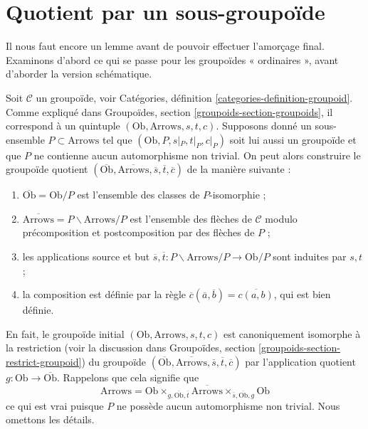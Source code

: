 \section{Quotient par un sous-groupoïde}
\label{section-dividing}

\noindent
Il nous faut encore un lemme avant de pouvoir effectuer l'amorçage final.
Examinons d'abord ce qui se passe pour les groupoïdes « ordinaires », avant
d'aborder la version schématique.

\medskip\noindent
Soit $\mathcal{C}$ un groupoïde, voir
Catégories, définition \ref{categories-definition-groupoid}.
Comme expliqué dans
Groupoïdes, section \ref{groupoids-section-groupoids},
il correspond à un quintuple $(\text{Ob}, \text{Arrows}, s, t, c)$.
Supposons donné un sous-ensemble $P \subset \text{Arrows}$ tel que
$(\text{Ob}, P, s|_P, t|_P, c|_P)$ soit lui aussi un groupoïde et que
$P$ ne contienne aucun automorphisme non trivial. On peut alors construire
le groupoïde quotient
$(\overline{\text{Ob}}, \overline{\text{Arrows}}, \overline{s},
\overline{t}, \overline{c})$
de la manière suivante :
\begin{enumerate}
\item $\overline{\text{Ob}} = \text{Ob}/P$
est l'ensemble des classes de $P$-isomorphie ;
\item $\overline{\text{Arrows}} = P\backslash \text{Arrows}/P$
est l'ensemble des flèches de $\mathcal{C}$ modulo précomposition et
postcomposition par des flèches de $P$ ;
\item les applications source et but
$\overline{s}, \overline{t} : P\backslash \text{Arrows}/P \to \text{Ob}/P$
sont induites par $s, t$ ;
\item la composition est définie par la règle
$\overline{c}(\overline{a}, \overline{b}) = \overline{c(a, b)}$,
qui est bien définie.
\end{enumerate}
En fait, le groupoïde initial
$(\text{Ob}, \text{Arrows}, s, t, c)$ est canoniquement
isomorphe à la restriction (voir la discussion dans
Groupoïdes, section \ref{groupoids-section-restrict-groupoid})
du groupoïde
$(\overline{\text{Ob}}, \overline{\text{Arrows}}, \overline{s},
\overline{t}, \overline{c})$ par l'application quotient
$g : \text{Ob} \to \overline{\text{Ob}}$. Rappelons que cela signifie
que
$$
\text{Arrows} =
\text{Ob}
\times_{g, \overline{\text{Ob}}, \overline{t}}
\overline{\text{Arrows}}
\times_{\overline{s}, \overline{\text{Ob}}, g}
\text{Ob}
$$
ce qui est vrai puisque $P$ ne possède aucun automorphisme non trivial.
Nous omettons les détails.

